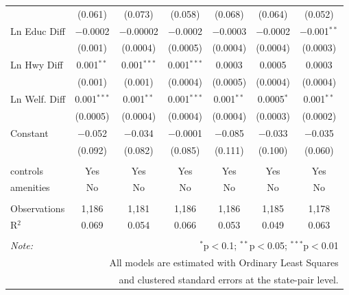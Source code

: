 \begin{table}[!htbp]
\begin{tabular}{@{\extracolsep{5pt}}lcccccc}
  & (0.061) & (0.073) & (0.058) & (0.068) & (0.064) & (0.052) \\ 
  Ln Educ Diff & $-$0.0002 & $-$0.00002 & $-$0.0002 & $-$0.0003 & $-$0.0002 & $-$0.001$^{**}$ \\ 
  & (0.001) & (0.0004) & (0.0005) & (0.0004) & (0.0004) & (0.0003) \\ 
  Ln Hwy Diff & 0.001$^{**}$ & 0.001$^{***}$ & 0.001$^{***}$ & 0.0003 & 0.0005 & 0.0003 \\ 
  & (0.001) & (0.001) & (0.0004) & (0.0005) & (0.0004) & (0.0004) \\ 
  Ln Welf. Diff & 0.001$^{***}$ & 0.001$^{**}$ & 0.001$^{***}$ & 0.001$^{**}$ & 0.0005$^{*}$ & 0.001$^{**}$ \\ 
  & (0.0005) & (0.0004) & (0.0004) & (0.0004) & (0.0003) & (0.0002) \\ 
  Constant & $-$0.052 & $-$0.034 & $-$0.0001 & $-$0.085 & $-$0.033 & $-$0.035 \\ 
  & (0.092) & (0.082) & (0.085) & (0.111) & (0.100) & (0.060) \\ 
 \hline \\[-1.8ex] 
controls & Yes & Yes & Yes & Yes & Yes & Yes \\ 
amenities & No & No & No & No & No & No \\ 
\hline \\[-1.8ex] 
Observations & 1,186 & 1,181 & 1,186 & 1,186 & 1,185 & 1,178 \\ 
R$^{2}$ & 0.069 & 0.054 & 0.066 & 0.053 & 0.049 & 0.063 \\ 
\hline 
\hline \\[-1.8ex] 
\textit{Note:}  & \multicolumn{6}{r}{$^{*}$p$<$0.1; $^{**}$p$<$0.05; $^{***}$p$<$0.01} \\ 
 & \multicolumn{6}{r}{All models are estimated with Ordinary Least Squares} \\ 
 & \multicolumn{6}{r}{and clustered standard errors at the state-pair level.} \\ 
\end{tabular} 
\end{table} 
